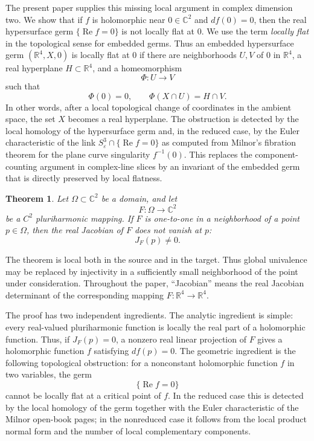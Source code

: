 \documentclass[11pt]{amsart}
\newtheorem{theorem}{Theorem}
\theoremstyle{definition}
\theoremstyle{remark}
\newcommand{\C}{\mathbb C}
\newcommand{\R}{\mathbb R}
\begin{document}
The present paper supplies this missing local argument in complex
dimension two. We show that if $f$ is holomorphic near $0\in\mathbb C^2$
and $df(0)=0$, then the real hypersurface germ
$\{\operatorname{Re} f=0\}$ is not locally flat at $0$. We use the term \emph{locally flat} in the topological sense for
embedded germs. Thus an embedded hypersurface germ \((\R^4,X,0)\) is
locally flat at \(0\) if there are neighborhoods \(U,V\) of \(0\) in
\(\R^4\), a real hyperplane \(H\subset\R^4\), and a homeomorphism
\[
        \Phi:U\to V
\]
such that
\[
        \Phi(0)=0,
        \qquad
        \Phi(X\cap U)=H\cap V.
\]
In other words, after a local topological change of coordinates in the
ambient space, the set \(X\) becomes a real hyperplane. The obstruction
is detected by the local homology of the hypersurface germ and, in the
reduced case, by the Euler characteristic of the link
$S^3_\varepsilon\cap\{\operatorname{Re} f=0\}$ as computed from
Milnor's fibration theorem for the plane curve singularity $f^{-1}(0)$.
This replaces the component-counting argument in complex-line slices
by an invariant of the embedded germ that is directly preserved by
local flatness.


\begin{theorem}\label{th:main}
Let \(\Omega\subset\C^2\) be a domain, and let
\[
        F:\Omega\longrightarrow\C^2
\]
be a \(C^2\) pluriharmonic mapping. If \(F\) is one-to-one in a
neighborhood of a point \(p\in\Omega\), then the real Jacobian of \(F\)
does not vanish at \(p\):
\[
        J_F(p)\ne0.
\]
\end{theorem}

The theorem is local both in the source and in the target. Thus global
univalence may be replaced by injectivity in a sufficiently small
neighborhood of the point under consideration. Throughout the paper,
``Jacobian'' means the real Jacobian determinant of the corresponding
mapping \(F:\R^4\to\R^4\).

The proof has two independent ingredients. The analytic ingredient is
simple: every real-valued pluriharmonic function is locally the real
part of a holomorphic function. Thus, if \(J_F(p)=0\), a nonzero real
linear projection of \(F\) gives a holomorphic function \(f\) satisfying
\(df(p)=0\). The geometric ingredient is the following topological
obstruction: for a nonconstant holomorphic function \(f\) in two
variables, the germ
\[
        \{\operatorname{Re} f=0\}
\]
cannot be locally flat at a critical point of \(f\). In the reduced
case this is detected by the local homology of the germ together with
the Euler characteristic of the Milnor open-book pages; in the
nonreduced case it follows from the local product normal form and the
number of local complementary components.
\end{document}
